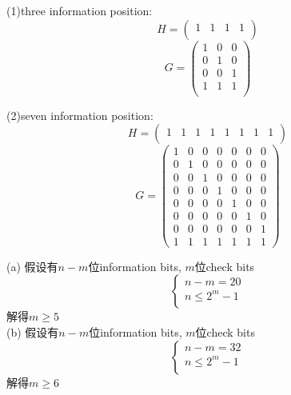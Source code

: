 \documentclass[a4paper, justified]{tufte-handout}
\begin{document}
\begin{solution}
  (1)three information position:\\
  $$H=\begin{pmatrix}1 & 1 & 1 & 1 \\
    \end{pmatrix}$$
  $$G=\begin{pmatrix}1 & 0 & 0 \\
               0 & 1 & 0 \\
               0 & 0 & 1 \\
               1 & 1 & 1 \\
    \end{pmatrix}$$

  \noindent (2)seven information position:\\
  $$H=\begin{pmatrix}1 & 1 & 1 & 1 & 1 & 1 & 1 & 1 \\
    \end{pmatrix}$$
  $$G=\begin{pmatrix}1 & 0 & 0 & 0 & 0 & 0 & 0 \\
               0 & 1 & 0 & 0 & 0 & 0 & 0 \\
               0 & 0 & 1 & 0 & 0 & 0 & 0 \\
               0 & 0 & 0 & 1 & 0 & 0 & 0 \\
               0 & 0 & 0 & 0 & 1 & 0 & 0 \\
               0 & 0 & 0 & 0 & 0 & 1 & 0 \\
               0 & 0 & 0 & 0 & 0 & 0 & 1 \\
               1 & 1 & 1 & 1 & 1 & 1 & 1
    \end{pmatrix}$$
\end{solution}

\begin{problem}[TJ 8-23]
\end{problem}

\begin{solution}
  (a)
  假设有$n-m$位information bits, $m$位check bits
  $$ \left\{
    \begin{aligned}
      n-m =  20       \\
      n \leq 2^ m - 1 \\
    \end{aligned}
    \right.
  $$
  解得$m\geq 5$\\
  (b)
  假设有$n-m$位information bits, $m$位check bits
  $$ \left\{
    \begin{aligned}
      n-m =  32       \\
      n \leq 2^ m - 1 \\
    \end{aligned}
    \right.
  $$
  解得$m\geq 6$
\end{solution}
\end{document}
